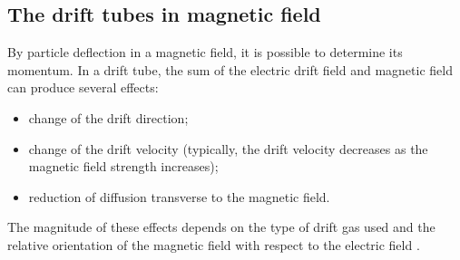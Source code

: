 \subsection{The drift tubes in magnetic field}
By particle deflection in a magnetic field, it is possible to determine its momentum.
In a drift tube, the sum of the electric drift field and magnetic field can 
produce several effects: 
\begin{itemize} 
    \item change of the drift direction; 
    \item change of the drift velocity (typically, the drift velocity decreases 
    as the magnetic field strength increases); 
    \item reduction of diffusion transverse to the magnetic field. 
\end{itemize}

The magnitude of these effects depends on the type of drift gas 
used and the relative orientation of the magnetic field with respect to the electric field \cite{kola}.

